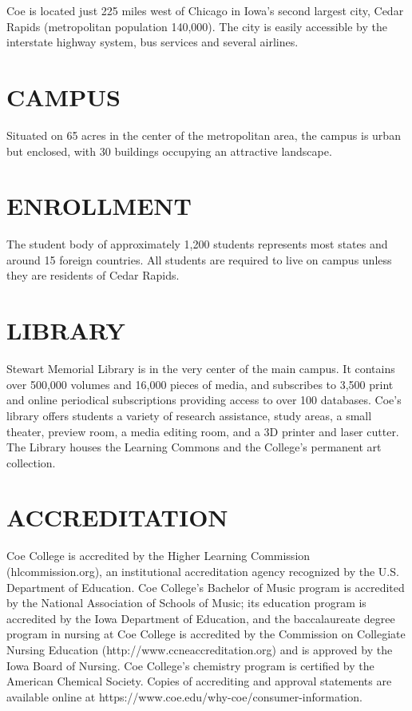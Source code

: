 \documentclass[
  letterpaper,
]{scrbook}
\begin{document}
Coe is located just 225 miles west of Chicago in Iowa's second largest
city, Cedar Rapids (metropolitan population 140,000). The city is easily
accessible by the interstate highway system, bus services and several
airlines.

\section{CAMPUS}\label{campus}

Situated on 65 acres in the center of the metropolitan area, the campus
is urban but enclosed, with 30 buildings occupying an attractive
landscape.

\section{ENROLLMENT}\label{enrollment}

The student body of approximately 1,200 students represents most states
and around 15 foreign countries. All students are required to live on
campus unless they are residents of Cedar Rapids.

\section{LIBRARY}\label{library}

Stewart Memorial Library is in the very center of the main campus. It
contains over 500,000 volumes and 16,000 pieces of media, and subscribes
to 3,500 print and online periodical subscriptions providing access to
over 100 databases. Coe's library offers students a variety of research
assistance, study areas, a small theater, preview room, a media editing
room, and a 3D printer and laser cutter. The Library houses the Learning
Commons and the College's permanent art collection.

\section{ACCREDITATION}\label{accreditation}

Coe College is accredited by the Higher Learning Commission
(hlcommission.org), an institutional accreditation agency recognized by
the U.S. Department of Education. Coe College's Bachelor of Music
program is accredited by the National Association of Schools of Music;
its education program is accredited by the Iowa Department of Education,
and the baccalaureate degree program in nursing at Coe College is
accredited by the Commission on Collegiate Nursing Education
(http://www.ccneaccreditation.org) and is approved by the Iowa Board of
Nursing. Coe College's chemistry program is certified by the American
Chemical Society. Copies of accrediting and approval statements are
available online at https://www.coe.edu/why-coe/consumer-information.
\end{document}
